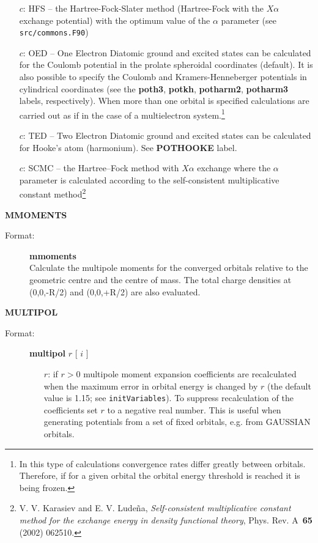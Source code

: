 \documentclass[10pt,a4paper]{article}
\newcommand{\ft}[1]{\texttt{#1}}
\newcommand{\fb}[1]{\textbf{#1}}
\begin{document}
\begin{description}
\begin{description}
\begin{itemize}
\item[$c$:] HFS -- the Hartree-Fock-Slater method (Hartree-Fock with the
  $X\alpha$ exchange potential) with the optimum value of the $\alpha$
  parameter (see \ft{src/commons.F90})

\item[$c$:] OED -- One Electron Diatomic ground and excited states can be
  calculated for the Coulomb potential in the prolate spheroidal
  coordinates (default). It is also possible to specify the Coulomb and
  Kramers-Henneberger potentials in cylindrical coordinates (see the
  \fb{poth3}, \fb{potkh}, \fb{potharm2}, \fb{potharm3} labels,
  respectively). When more than one orbital is specified calculations are
  carried out as if in the case of a multielectron system.\footnote{In this
    type of calculations convergence rates differ greatly between
    orbitals. Therefore, if for a given orbital the orbital energy
    threshold is reached it is being frozen.}

\item[$c$:] TED -- Two Electron Diatomic ground and excited states can be
  calculated for Hooke's atom (harmonium). See \textbf{POTHOOKE} label.

  
\item[$c$:] SCMC -- the Hartree--Fock method with $X\alpha$ exchange where
  the $\alpha$ parameter is calculated according to the self-consistent
  multiplicative constant method\footnote{V. V. Karasiev and
    E. V. Lude\~{n}a, \textsl{Self-consistent multiplicative constant
      method for the exchange energy in density functional theory},
    Phys. Rev. A~\textbf{65} (2002)
    062510. }

\end{itemize}
\end{description}

\item \textbf{MMOMENTS}
\begin{description}
\item[Format:] \textbf{mmoments} \\
  Calculate the multipole moments for the converged orbitals relative to
  the geometric centre and the centre of mass. The total charge densities at
  (0,0,-R/2) and (0,0,+R/2) are also evaluated.
\end{description}

\item \textbf{MULTIPOL}
\begin{description}
\item[Format:] \textbf{multipol} $r$ [ $i$ ]
\begin{itemize}
\item[$r$:] if $r>0$ multipole moment expansion coefficients are
  recalculated when the maximum error in orbital energy is changed by $r$
  (the default value is 1.15; see \ft{initVariables}). To suppress
  recalculation of the coefficients set $r$ to a negative real number. This
  is useful when generating potentials from a set of fixed orbitals,
  e.g. from GAUSSIAN orbitals. 


\end{itemize}
\end{description}
\end{description}
\end{document}
